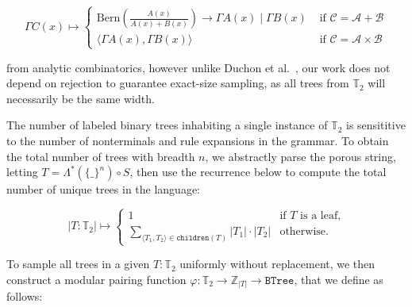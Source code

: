 \documentclass[sigplan,review,acmsmall,nonacm,anonymous]{acmart}\settopmatter{printfolios=false,printccs=false,printacmref=false}
\begin{document}
\begin{equation}
  \Gamma C(x) \mapsto \begin{cases}
  \text{Bern} \left(\frac{A(x)}{A(x) + B(x)}\right) \rightarrow \Gamma A(x) \mid \Gamma B(x) & \text{ if } \mathcal{C}=\mathcal{A}+\mathcal{B} \\
  \big\langle \Gamma A(x), \Gamma B(x)\big\rangle & \text{ if } \mathcal{C}=\mathcal{A} \times \mathcal{B}
  \end{cases}
\end{equation}

\noindent from analytic combinatorics, however unlike Duchon et al.~\cite{duchon2004boltzmann}, our work does not depend on rejection to guarantee exact-size sampling, as all trees from $\mathbb{T}_2$ will necessarily be the same width.

The number of labeled binary trees inhabiting a single instance of $\mathbb{T}_2$ is sensititive to the number of nonterminals and rule expansions in the grammar. To obtain the total number of trees with breadth $n$, we abstractly parse the porous string, letting $T=\Lambda^*(\{\_\}^n) \circ S$, then use the recurrence below to compute the total number of unique trees in the language:

\begin{equation}
  |T: \mathbb{T}_2| \mapsto \begin{cases}
    1 & \text{if $T$ is a leaf,} \\
    \sum_{\langle T_1, T_2\rangle \in \texttt{children}(T)} |T_1| \cdot |T_2| & \text{otherwise.}
  \end{cases}
\end{equation}

To sample all trees in a given $T: \mathbb{T}_2$ uniformly without replacement, we then construct a modular pairing function $\varphi: \mathbb{T}_2 \rightarrow \mathbb{Z}_{|T|} \rightarrow \texttt{BTree}$, that we define as follows:
\end{document}
